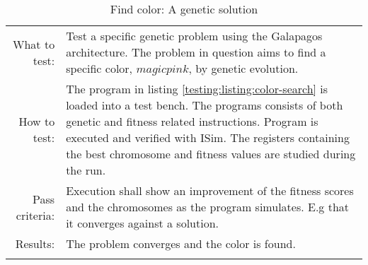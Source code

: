\begin{table}[H]
  \begin{tabular}{r | p{8cm}}
    \noalign{\smallskip}\hline\noalign{\smallskip}
    
    What to test:  &  Test a specific genetic problem using the Galapagos architecture. 
                      The problem in question aims to find a specific color, $magic pink$, by 
                      genetic evolution. \\

    \noalign{\smallskip}\hline\noalign{\smallskip}

    How to test:   &  The program in listing \ref{testing:listing:color-search} is loaded into a test bench. The
    programs consists of both genetic and fitness related instructions. Program is executed and
    verified with ISim. The registers containing the best chromosome and fitness values are studied
    during the run. \\

    \noalign{\smallskip}\hline\noalign{\smallskip}

    Pass criteria: &  Execution shall show an improvement of the fitness scores and the chromosomes
    as the program simulates. E.g that it converges against a solution. \\

    \noalign{\smallskip}\hline\noalign{\smallskip}
    
    Results: &   The problem converges and the color is found.\\
   \noalign{\smallskip}\hline\noalign{\smallskip}
  
  
  
  \end{tabular}
  \caption{Find color: A genetic solution}
  \label{testing:genetic:genetic_color}
\end{table}

